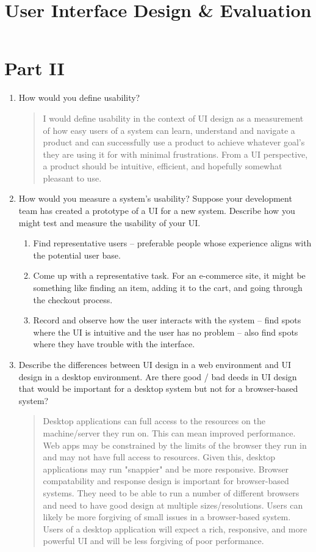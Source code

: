 \documentclass{article}
\title{User Interface Design \& Evaluation}
\begin{document}
\thispagestyle{fancy}

\section*{Part II}

\begin{enumerate}
    \item How would you define usability?

    \begin{quote}
    I would define usability in the context of UI design as a measurement of how easy users of a system can learn, understand and navigate a product and can successfully use a product to achieve whatever goal's they are using it for with minimal frustrations. From a UI perspective, a product should be intuitive, efficient, and hopefully somewhat pleasant to use.
    \end{quote}

    \item How would you measure a system's usability? Suppose your development team has created a prototype of a UI for a new system. Describe how you might test and measure the usability of your UI.

    \begin{enumerate}[label=\arabic*.]
        \item Find representative users -- preferable people whose experience aligns with the potential user base.
        \item Come up with a representative task. For an e-commerce site, it might be something like finding an item, adding it to the cart, and going through the checkout process.
        \item Record and observe how the user interacts with the system -- find spots where the UI is intuitive and the user has no problem -- also find spots where they have trouble with the interface.
    \end{enumerate}

    \item Describe the differences between UI design in a web environment and UI design in a desktop environment. Are there good / bad deeds in UI design that would be important for a desktop system but not for a browser-based system?

    \begin{quote}
    Desktop applications can full access to the resources on the machine/server they run on. This can mean improved performance. Web apps may be constrained by the limits of the browser they run in and may not have full access to resources. Given this, desktop applications may run "snappier" and be more responsive. Browser compatability and response design is important for browser-based systems. They need to be able to run a number of different browsers and need to have good design at multiple sizes/resolutions. Users can likely be more forgiving of small issues in a browser-based system. Users of a desktop application will expect a rich, responsive, and more powerful UI and will be less forgiving of poor performance.
    \end{quote}


\end{enumerate}
\end{document}
